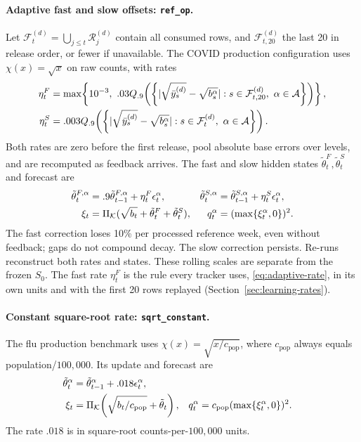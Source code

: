 \documentclass[11pt,a4paper]{article}
\newcommand{\A}{\mathcal{A}}
\newcommand{\K}{\mathcal{K}}
\theoremstyle{definition}
\theoremstyle{remark}
\begin{document}
\paragraph{Adaptive fast and slow offsets: \texttt{ref\_op}.}
Let $\mathcal F_t^{(d)}=\bigcup_{j\le t}\mathcal R_j^{(d)}$ contain
all consumed rows, and $\mathcal F_{t,20}^{(d)}$ the last 20 in release
order, or fewer if unavailable.
The COVID production configuration uses $\chi(x)=\sqrt{x}$ on raw counts,
with rates
\begin{align}
 \eta_t^F&=\max\!\left\{10^{-3},\ .03Q_{.9}\!\left(
 \left\{|\sqrt{\bar y_s^{(d)}}-\sqrt{b_s^\alpha}|:
 s\in\mathcal F_{t,20}^{(d)},\ \alpha\in\A\right\}\right)\right\},
 \notag\\
 \eta_t^S&=.003Q_{.9}\!\left(
 \left\{|\sqrt{\bar y_s^{(d)}}-\sqrt{b_s^\alpha}|:
 s\in\mathcal F_t^{(d)},\ \alpha\in\A\right\}\right).
 \label{eq:ref-op-rates}
\end{align}
Both rates are zero before the first release, pool absolute base errors
over levels, and are recomputed as feedback arrives.
The fast and slow hidden states $\tilde\theta_t^F,\tilde\theta_t^S$
and forecast are
\begin{align}
 \tilde\theta_t^{F,\alpha}
 &=.9\tilde\theta_{t-1}^{F,\alpha}+\eta_t^F\epsilon_t^\alpha,
 &\tilde\theta_t^{S,\alpha}
 &=\tilde\theta_{t-1}^{S,\alpha}+\eta_t^S\epsilon_t^\alpha,
 \notag\\
 \xi_t&=\Pi_\K(\sqrt{b_t}+\tilde\theta_t^F+\tilde\theta_t^S),
 &q_t^\alpha&=(\max\{\xi_t^\alpha,0\})^2.
 \label{eq:ref-op-update}
\end{align}
The fast correction loses 10\% per processed reference week, even without
feedback; gaps do not compound decay. The slow correction persists.
Re-runs reconstruct both rates and states. These rolling scales are
separate from the frozen $S_0$. The fast rate $\eta_t^F$ is the rule every
tracker uses, \eqref{eq:adaptive-rate}, in its own units and with the
first 20 rows replayed (Section~\ref{sec:learning-rates}).

\paragraph{Constant square-root rate: \texttt{sqrt\_constant}.}
The flu production benchmark uses $\chi(x)=\sqrt{x/c_{\mathrm{pop}}}$,
where $c_{\mathrm{pop}}$ always equals population/$100{,}000$.
Its update and forecast are
\begin{align}
 \tilde\theta_t^\alpha
 &=\tilde\theta_{t-1}^\alpha+.018\epsilon_t^\alpha,
 \notag\\
 \xi_t&=\Pi_\K\!\left(\sqrt{b_t/c_{\mathrm{pop}}}+\tilde\theta_t\right),
 &q_t^\alpha&=c_{\mathrm{pop}}(\max\{\xi_t^\alpha,0\})^2.
 \label{eq:sqrt-constant-update}
\end{align}
The rate $.018$ is in square-root counts-per-$100{,}000$ units.
\end{document}
